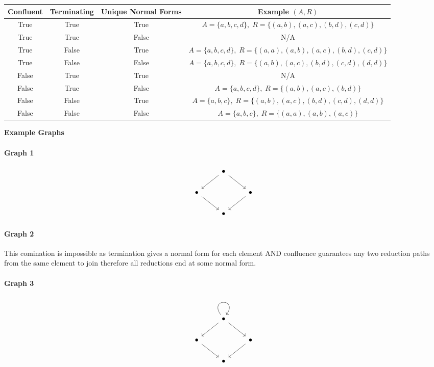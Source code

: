 \documentclass{article}
\theoremstyle{theorem}
\theoremstyle{definition}
\theoremstyle{remark}
\begin{document}
\begin{center}
\begin{tabular}{|c|c|c|c|}
\hline
\textbf{Confluent} & \textbf{Terminating} & \textbf{Unique Normal Forms} & \textbf{Example $(A,R)$} \\
\hline
True  & True  & True  & $A = \{a,b,c,d\},\; R = \{(a,b),(a,c),(b,d),(c,d)\}$ \\
\hline
True  & True  & False & N/A \\
\hline
True  & False & True  & $A = \{a,b,c,d\},\; R = \{(a,a),(a,b),(a,c),(b,d),(c,d)\}$ \\
\hline
True  & False & False & $A = \{a,b,c,d\},\; R = \{(a,b),(a,c),(b,d),(c,d),(d,d)\}$ \\
\hline
False & True  & True  & N/A \\
\hline
False & True  & False & $A = \{a,b,c,d\},\; R = \{(a,b),(a,c),(b,d)\}$ \\
\hline
False & False & True  & $A = \{a,b,c\},\; R = \{(a,b),(a,c),(b,d),(c,d),(d,d)\}$ \\
\hline
False & False & False & $A = \{a,b,c\},\; R = \{(a,a),(a,b),(a,c)\}$ \\
\hline
\end{tabular}
\end{center}

\textbf{Example Graphs}

\paragraph{Graph 1}
\[\begin{tikzcd}
	& \bullet \\
	\bullet && \bullet \\
	& \bullet
	\arrow[from=1-2, to=2-1]
	\arrow[from=1-2, to=2-3]
	\arrow[from=2-1, to=3-2]
	\arrow[from=2-3, to=3-2]
\end{tikzcd}\]

\paragraph{Graph 2}
This comination is impossible as termination gives a normal form for each element AND confluence guarantees any two reduction paths from the same element to join therefore all reductions end at some normal form.

\paragraph{Graph 3}
\[\begin{tikzcd}
	& \bullet \\
	\bullet && \bullet \\
	& \bullet
	\arrow[from=1-2, to=1-2, loop, in=55, out=125, distance=10mm]
	\arrow[from=1-2, to=2-1]
	\arrow[from=1-2, to=2-3]
	\arrow[from=2-1, to=3-2]
	\arrow[from=2-3, to=3-2]
\end{tikzcd}\]
\end{document}
